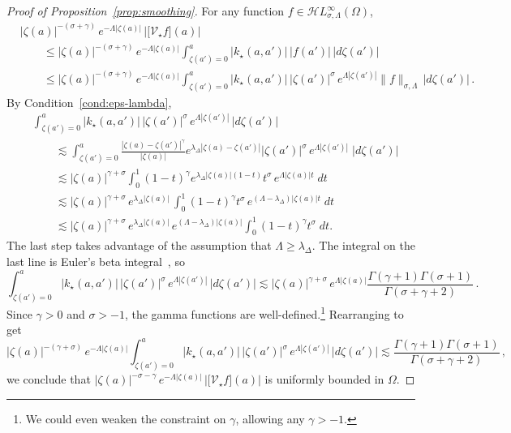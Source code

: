 \documentclass[final]{siamart220329}
\newcommand{\singexp}[2]{\mathcal{H}L^\infty_{#1, #2}}
\newcommand{\softpart}{\mathcal{V}_\star}
\newcommand{\softker}{k_\star}
\newcommand{\domain}{\Omega}
\newenvironment{revtwo}{\color{revred}}{\color{black}}
\newenvironment{revtwo}{}{}
\begin{document}
\begin{proof}[Proof of Proposition~\ref{prop:smoothing}]
For any function $f\in\singexp{\sigma}{\Lambda}(\domain)$,
\begin{revtwo}
\begin{align*}
& |\zeta(a)|^{-(\sigma+\gamma)} \, e^{-\Lambda |\zeta(a)|} \, \Big \vert \big[ \softpart f\big](a)\Big\vert \\
& \qquad \leq |\zeta(a)|^{-(\sigma+\gamma)}\, e^{-\Lambda |\zeta(a)|} \int_{\zeta(a')=0}^a |\softker(a,a')|\, |f(a')| \, |d\zeta(a')| \\
& \qquad \leq |\zeta(a)|^{-(\sigma+\gamma)}\, e^{-\Lambda |\zeta(a)|} \int_{\zeta(a')=0}^a |\softker(a,a')|\, |\zeta(a')|^{\sigma}\, e^{\Lambda |\zeta(a')|} \|f\|_{\sigma,\Lambda} \, |d\zeta(a')|\,.
\end{align*}
\end{revtwo}
By Condition~\eqref{cond:eps-lambda},
\begin{revtwo}
\begin{align*}
& \int_{\zeta(a')=0}^a |\softker(a,a')|\, |\zeta(a')|^{\sigma}\, e^{\Lambda |\zeta(a')|} \, |d\zeta(a')| \\
& \qquad \lesssim \int_{\zeta(a')=0}^a \frac{|\zeta(a)-\zeta(a')|^\gamma}{|\zeta(a)|} e^{\lambda_\Delta |\zeta(a)-\zeta(a')|} |\zeta(a')|^{\sigma}\, e^{\Lambda|\zeta(a')|}\;|d\zeta(a')|\\
& \qquad \lesssim |\zeta(a)|^{\gamma+\sigma} \int_{0}^1 (1-t)^\gamma e^{\lambda_\Delta |\zeta(a)|(1-t)} t^{\sigma}\, e^{\Lambda|\zeta(a)| t}\;dt\\
& \qquad \lesssim |\zeta(a)|^{\gamma+\sigma}\, e^{\lambda_\Delta |\zeta(a)|}\,  \int_{0}^1 (1-t)^\gamma  t^{\sigma}\,e^{(\Lambda-\lambda_\Delta)|\zeta(a)| t}\;dt\\
& \qquad \lesssim |\zeta(a)|^{\gamma+\sigma}\, e^{\lambda_\Delta |\zeta(a)|}\,e^{(\Lambda-\lambda_\Delta)|\zeta(a)|}\int_{0}^1 (1-t)^\gamma  t^{\sigma}\;dt.
\end{align*}
\end{revtwo}
The last step takes advantage of the assumption that $\Lambda \ge \lambda_\Delta$. The integral on the last line is Euler's beta integral~\cite[equation~5.12.1]{dlmf}, so
\begin{revtwo}
\[ \int_{\zeta(a')=0}^a |\softker(a, a')|\, |\zeta(a')|^{\sigma}\, e^{\Lambda |\zeta(a')|} \, |d\zeta(a')| \lesssim |\zeta(a)|^{\gamma+\sigma}\, e^{\Lambda |\zeta(a)|} \frac{\Gamma(\gamma+1)\Gamma(\sigma+1)}{\Gamma(\sigma+\gamma+2)}\,. \]
\end{revtwo}
Since $\gamma > 0$ and $\sigma > -1$, the gamma functions are well-defined.\footnote{We could even weaken the constraint on $\gamma$, allowing any $\gamma > -1$.} Rearranging to get
\begin{revtwo}
\[ |\zeta(a)|^{-(\gamma+\sigma)}\, e^{-\Lambda |\zeta(a)|} \int_{\zeta(a')=0}^a |\softker(a,a')|\, |\zeta(a')|^{\sigma}\, e^{\Lambda |\zeta(a')|} \, |d\zeta(a')| \lesssim \frac{\Gamma(\gamma+1)\Gamma(\sigma+1)}{\Gamma(\sigma+\gamma+2)}\,, \]    
\end{revtwo}
we conclude that $|\zeta(a)|^{-\sigma-\gamma} \, e^{-\Lambda |\zeta(a)|} \, \Big \vert \big[ \softpart f\big](a)\Big\vert$ is uniformly bounded in $\domain$. 
\end{proof}
\end{document}
